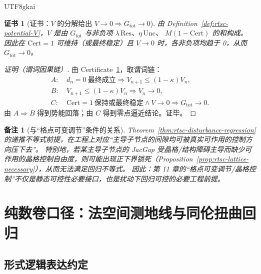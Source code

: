 \documentclass[12pt]{article}
\newtheorem{remark}{备注}[section]
\newtheorem{certificate}{证书}[section]
\begin{document}
\begin{CJK*}{UTF8}{gkai}
\begin{certificate}[证书：$V$ 的分解给出 $V\to 0\Rightarrow G_{\mathrm{tot}}\to 0$]
\label{cert:rtsc-disturbance-vanish}
由 Definition~\ref{def:rtsc-potential-V}，$V$ 是由 $G_{\mathrm{tot}}$ 与非负项 $\lambda\,\mathrm{Res}$、$\eta\,\mathrm{Unc}$、
  $M(1-\mathrm{Cert})$ 的和构成。
因此在 $\mathrm{Cert}=1$ 可维持（或最终稳定）且 $V\to 0$ 时，各非负项均趋于 0，从而 $G_{\mathrm{tot}}\to 0$。
\end{certificate}

\begin{proof}[证明（谓词因果链）]
由 Certificate~\ref{cert:rtsc-disturbance-vanish}，取谓词链：
\[
\begin{aligned}
A:&\ d_n=0\ \text{最终成立}\Rightarrow V_{n+1}\le (1-\kappa)V_n,\\
B:&\ V_{n+1}\le (1-\kappa)V_n\Rightarrow V_n\to 0,\\
C:&\ \mathrm{Cert}=1\ \text{保持或最终稳定}\wedge V\to 0\Rightarrow G_{\mathrm{tot}}\to 0.
\end{aligned}
\]
由 $A\Rightarrow B$ 得到势能回落；由 $C$ 得到零点逼近结论。证毕。
\end{proof}

\begin{remark}[与“格点可变调节”条件的关系]
Theorem~\ref{thm:rtsc-disturbance-regression} 的递推不等式前提，在工程上对应“主导子节点的间隙均可被真实可作用的控制方向压下去”。
特别地，若某主导子节点的 JacGap 受晶格/结构障碍主导而缺少可作用的晶格控制自由度，则可能出现正下界锁死（Proposition~\ref{prop:rtsc-lattice-necessary}），从而无法满足回归不等式。
因此：第 11 章的“格点可变调节/晶格控制”不仅是静态可控性必要接口，也是扰动下回归可控的必要工程前提。
\end{remark}

\clearpage
\section{纯数卷口径：法空间测地线与同伦扭曲回归}
\label{sec:puremath-lawspace-geodesic-homotopy-twist}

\subsection{形式逻辑表达约定}


\end{CJK*}
\end{document}
